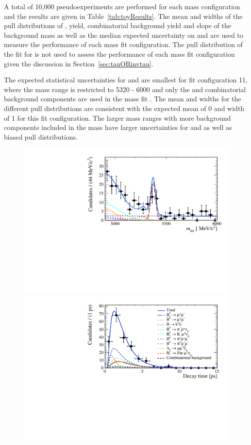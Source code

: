 {A total of 10,000 pseudoexperiments are performed for each mass configuration and the results are given in Table~\ref{tab:toyResults}. The mean and widths of the pull distributions of \Gmumu, \bsmumu yield, combinatorial background yield and slope of the background mass \pdf as well as the median expected uncertainty on \tmumu and \Gmumu are used to measure the performance of each mass fit configuration. The pull distribution of the fit for \tmumu is not used to assess the performance of each mass fit configuration given the discussion in Section~\ref{sec:tauORinvtau}.



The expected statistical uncertainties for \tmumu and \Gmumu are smallest for fit configuration 11, where the mass range is restricted to 5320 - 6000 \mevcc and only the \bsmumu and combinatorial background components are used in the mass fit \pdf. The mean and widths for the different pull distributions are consistent with the expected mean of 0 and width of 1 for this fit configuration. The larger mass ranges with more background components included in the mass \pdf have larger uncertainties for \tmumu and \Gmumu as well as biased pull distributions. %

\begin{figure}[htbp]
    \centering
        \includegraphics[width= 0.8 \textwidth]{./Figs/LifetimeMeasurement/mass_pdf2.pdf}
        \includegraphics[width= 0.8 \textwidth]{./Figs/LifetimeMeasurement/DT_pdf2.pdf}
 

\end{figure}}
